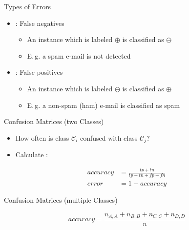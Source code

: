 \begin{frame}{Types of Errors}{}
	\begin{itemize}
		\item {}: False negatives
		\begin{itemize}
			\item An instance which is labeled $\oplus$ is classified as $\ominus$
			\item E.\,g. a spam e-mail is not detected
		\end{itemize}
		\item {}: False positives
		\begin{itemize}
			\item An instance which is labeled $\ominus$ is classified as $\oplus$
			\item E.\,g. a non-spam (ham) e-mail is classified as spam
		\end{itemize}
	\end{itemize}
	
	\begin{boxBlueNoFrame}
	\end{boxBlueNoFrame}
\end{frame}


\begin{frame}{Confusion Matrices (two Classes)}{}\important
	\vspace*{2mm}
	\begin{itemize}
		\item How often is class $\mathcal{C}_i$ confused with class $\mathcal{C}_j$?
		\item Calculate :
	\end{itemize}
	
	\vspace*{-5mm}
	\begin{align*}
		accuracy 	&= \frac{tp + tn}{tp + tn + fp + fn} \\[3mm]
		error		&= 1 - accuracy
	\end{align*}
\end{frame}


\begin{frame}{Confusion Matrices (multiple Classes)}{}
	
	
	\vspace*{2mm}
	\begin{equation*}
		accuracy = \frac{n_{A,A} + n_{B,B} + n_{C,C} + n_{D,D}}{n}
	\end{equation*}
\end{frame}


